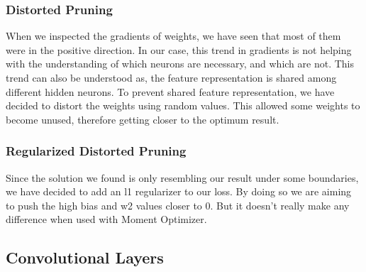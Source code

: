 
\subsubsection{Distorted Pruning}

When we inspected the gradients of weights, we have seen that most of them were in the positive direction. In our case, this trend in gradients is not helping with the understanding of which neurons are necessary, and which are not. This trend can also be understood as, the feature representation is shared among different hidden neurons. 
To prevent shared feature representation, we have decided to distort the weights using random values. This allowed some weights to become unused, therefore getting closer to the optimum result.
\subsubsection{Regularized Distorted Pruning}
Since the solution we found is only resembling our result under some boundaries, we have decided to add an l1 regularizer to our loss. By doing so we are aiming to push the high bias and w2 values closer to 0. But it doesn't really make any difference when used with Moment Optimizer.

\subsection{Convolutional Layers}

